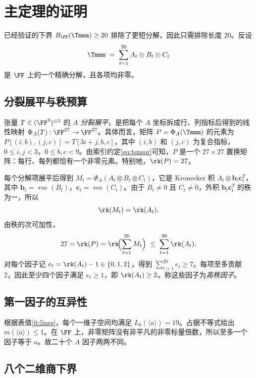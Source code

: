 \documentclass[11pt,a4paper]{article}
\begin{document}
\section{主定理的证明}\label{sec:proof}

已经验证的下界 $R_{\FF}(\Tmmm)\ge20$ 排除了更短分解，因此只需排除长度 20。反设
\begin{equation}\label{eq:decomp}
  \Tmmm \;=\; \sum_{t=1}^{20} A_t\otimes B_t\otimes C_t
\end{equation}
是 $\FF$ 上的一个精确分解，且各项均非零。

\subsection{分裂展平与秩预算}\label{sec:flattening}

张量 $T\in(\FF^9)^{\otimes3}$ 的 \emph{$A$ 分裂展平}，是把每个 $A$ 坐标拆成行、列指标后得到的线性映射 $\Phi_A(T):\FF^{27}\to\FF^{27}$。具体而言，矩阵 $P=\Phi_A(\Tmmm)$ 的元素为 $P[(i,b),(j,c)]=T[3i+j,b,c]$，其中 $(i,b)$ 和 $(j,c)$ 为复合指标，$0\le i,j<3$，$0\le b,c<9$。由索引约定\eqref{eq:tensor}可知，$P$ 是一个 $27\times27$ 置换矩阵：每行、每列都恰有一个非零元素。特别地，$\rk(P)=27$。

每个分解项展平后得到 $M_t=\Phi_A(A_t\otimes B_t\otimes C_t)$，它是 Kronecker 积 $A_t\otimes\mathbf{b}_t\mathbf{c}_t^T$，其中 $\mathbf{b}_t=\operatorname{vec}(B_t)$，$\mathbf{c}_t=\operatorname{vec}(C_t)$。由于 $B_t\ne0$ 且 $C_t\ne0$，外积 $\mathbf{b}_t\mathbf{c}_t^T$ 的秩为一，所以
\[
  \rk(M_t) = \rk(A_t).
\]
由秩的次可加性，
\begin{equation}\label{eq:rksum}
  27 = \rk(P) = \rk\!\Bigl(\sum_{t=1}^{20}M_t\Bigr) \;\le\; \sum_{t=1}^{20}\rk(A_t).
\end{equation}
对每个因子记 $e_t=\rk(A_t)-1\in\{0,1,2\}$，得到 $\sum_{t=1}^{20}e_t\ge7$。每项至多贡献 2，因此至少四个因子满足 $e_t\ge1$，即 $\rk(A_t)\ge2$。称这些因子为\emph{高秩因子}。

\subsection{第一因子的互异性}

根据表值\ref{it:lines}，每个一维子空间均满足 $L_0(\langle a\rangle)=19$。占据不等式给出 $m(\langle a\rangle)\le1$。在 $\FF$ 上，非零矩阵没有非平凡的非零标量倍数，所以至多一个因子等于 $a$。故二十个 $A$ 因子两两不同。

\subsection{八个二维商下界}\label{sec:dim2}
\end{document}
